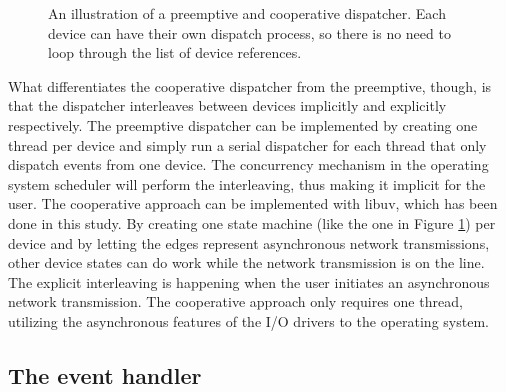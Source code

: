 \begin{figure}[h!]
    \centering

    \caption{An illustration of a preemptive and cooperative dispatcher. Each
    device can have their own dispatch process, so there is no need to loop
    through the list of device references.}

    \label{fig:dispatcher-pre-coop}
\end{figure}

What differentiates the cooperative dispatcher from the preemptive, though, is
that the dispatcher interleaves between devices implicitly and explicitly
respectively. The preemptive dispatcher can be implemented by creating one
thread per device and simply run a serial dispatcher for each thread that only
dispatch events from one device. The concurrency mechanism in the operating
system scheduler will perform the interleaving, thus making it implicit for the
user. The cooperative approach can be implemented with libuv, which has been
done in this study. By creating one state machine (like the one in Figure
\ref{fig:dispatcher-pre-coop}) per device and by letting the edges represent
asynchronous network transmissions, other device states can do work while the
network transmission is on the line. The explicit interleaving is happening
when the user initiates an asynchronous network transmission. The cooperative
approach only requires one thread, utilizing the asynchronous features of the
I/O drivers to the operating system.

\subsection{The event handler}

